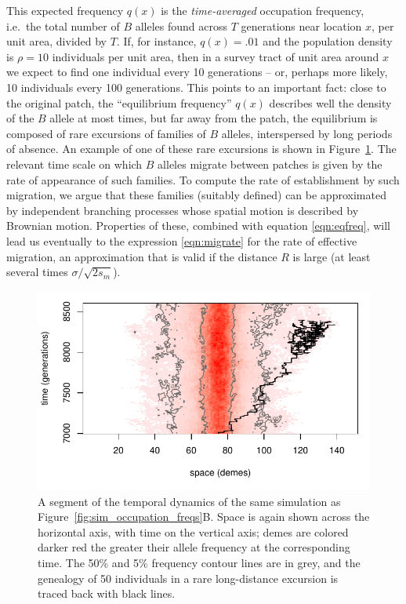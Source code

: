 \documentclass{article}
\begin{document}
This expected frequency $q(x)$ is the \emph{time-averaged} occupation frequency,
i.e.\ the total number of $B$ alleles found across $T$ generations near location $x$, per unit area, divided by $T$.
If, for instance, $q(x)=.01$ and the population density is $\rho=10$ individuals per unit area, 
then in a survey tract of unit area around $x$ we expect to find one individual every 10 generations
-- or, perhaps more likely, 10 individuals every 100 generations.
This points to an important fact: 
close to the original patch, the ``equilibrium frequency'' $q(x)$ describes well the density of the $B$ allele at most times,
but far away from the patch, 
the equilibrium is composed of rare excursions of families of $B$
alleles, interspersed by long periods of absence. 
An example of one of these rare excursions is shown in Figure~\ref{fig:sim_snapshots}.
The relevant time scale on which $B$ alleles migrate between patches is given by the rate of appearance of such families.
To compute the rate of establishment by such migration,
we argue that these families (suitably defined) can be approximated by
independent branching processes whose spatial motion is described by Brownian motion.
Properties of these, combined with equation \eqref{eqn:eqfreq},
will lead us eventually to the expression \eqref{eqn:migrate} for the rate of effective migration,
an approximation that is valid if the distance $R$ is large (at least several times $\sigma/\sqrt{2s_m}$).

\begin{figure}[ht!]
  \begin{center}
    \includegraphics{sim-snapshots}
  \end{center}
  \caption{
  A segment of the temporal dynamics of the same simulation as Figure~\ref{fig:sim_occupation_freqs}B.
  Space is again shown across the horizontal axis, with time on the vertical axis; 
  demes are colored darker red the greater their allele frequency at the corresponding time.
  The 50\% and 5\% frequency contour lines are in grey,
  and the genealogy of 50 individuals in a rare long-distance excursion is traced back with black lines.
  }   \label{fig:sim_snapshots}
\end{figure}
\end{document}
